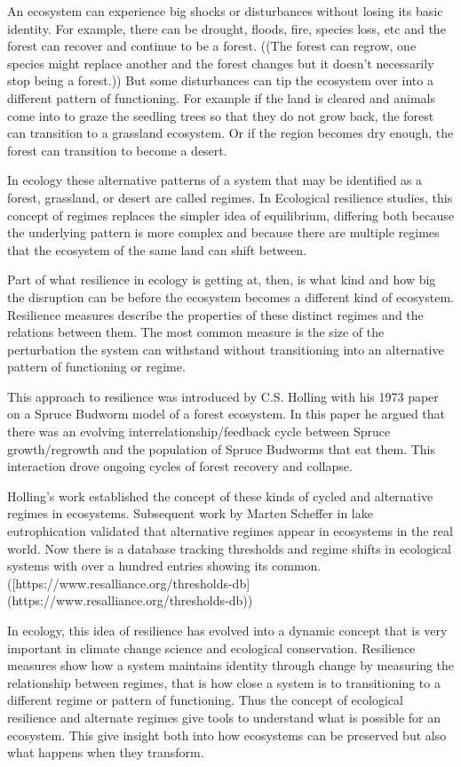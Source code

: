 An ecosystem can experience big shocks or disturbances without losing its basic identity. For example, there can be drought, floods, fire, species loss, etc and the forest can recover and continue to be a forest. 
((The forest can regrow, one species might replace another and the forest changes but it doesn’t necessarily stop being a forest.)) But some disturbances can tip the ecosystem over into a different pattern of functioning. For example if the land is cleared and animals come into to graze the seedling trees so that they do not grow back, the forest can transition to a grassland ecosystem. Or if the region becomes dry enough, the forest can transition to become a desert. 

In ecology these alternative patterns of a system that may be identified as a forest, grassland, or desert are called regimes. In Ecological resilience studies, this concept of regimes replaces the simpler idea of equilibrium, differing both because the underlying pattern is more complex and because there are multiple regimes that the ecosystem of the same land can shift between. 

Part of what resilience in ecology is getting at, then, is what kind and how big the disruption can be before the ecosystem becomes a different kind of ecosystem. Resilience measures describe the properties of these distinct regimes and the relations between them. The most common measure is the size of the perturbation the system can withstand without transitioning into an alternative pattern of functioning or regime.  

This approach to resilience was introduced by C.S. Holling with his 1973 paper on a Spruce Budworm model of a forest ecosystem. In this paper he argued that there was an evolving interrelationship/feedback cycle between Spruce growth/regrowth and the population of Spruce Budworms that eat them. This interaction drove ongoing cycles of forest recovery and collapse. 

Holling’s work established the concept of these kinds of cycled and alternative regimes in ecosystems. Subsequent work by Marten Scheffer in lake eutrophication validated that alternative regimes appear in ecosystems in the real world. Now there is a database tracking thresholds and regime shifts in ecological systems with over a hundred entries showing its common.  ([https://www.resalliance.org/thresholds-db](https://www.resalliance.org/thresholds-db)) 

In ecology, this idea of resilience has evolved into a dynamic concept that is very important in climate change science and ecological conservation. Resilience measures show how a system maintains identity through change by measuring the relationship between regimes, that is how close a system is to transitioning to a different regime or pattern of functioning. Thus the concept of ecological resilience and alternate regimes give tools to understand what is possible for an ecosystem. This give insight both into how ecosystems can be preserved but also what happens when they transform. 



